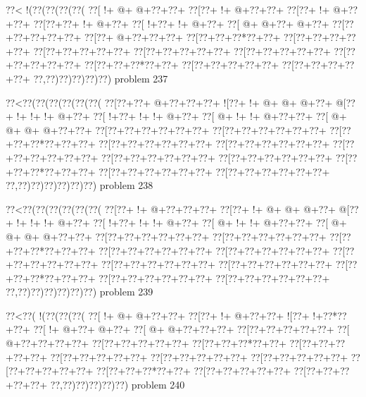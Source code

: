 \vbox{\vbox{\goo
\0??<\- !(\0??(\0??(\0??(\0??(
\0??[\- !+\- @+\- @+\0??+\0??+
\0??[\0??+\- !+\- @+\0??+\0??+
\0??[\0??+\- !+\- @+\0??+\0??+
\0??[\0??+\0??+\- !+\- @+\0??+
\0??[\- !+\0??+\- !+\- @+\0??+
\0??[\- @+\- @+\0??+\- @+\0??+
\0??[\0??+\0??+\0??+\0??+\0??+
\0??[\0??+\- @+\0??+\0??+\0??+
\0??[\0??+\0??+\0??*\0??+\0??+
\0??[\0??+\0??+\0??+\0??+\0??+
\0??[\0??+\0??+\0??+\0??+\0??+
\0??[\0??+\0??+\0??+\0??+\0??+
\0??[\0??+\0??+\0??+\0??+\0??+
\0??[\0??+\0??+\0??+\0??+\0??+
\0??[\0??+\0??+\0??*\0??+\0??+
\0??[\0??+\0??+\0??+\0??+\0??+
\0??[\0??+\0??+\0??+\0??+\0??+
\0??,\0??)\0??)\0??)\0??)\0??)
}
\hfil problem 237\hfil\break
}

\vbox{\vbox{\goo
\0??<\0??(\0??(\0??(\0??(\0??(\0??(
\0??[\0??+\0??+\- @+\0??+\0??+\0??+
\- ![\0??+\- !+\- @+\- @+\- @+\0??+
\- @[\0??+\- !+\- !+\- !+\- @+\0??+
\0??[\- !+\0??+\- !+\- !+\- @+\0??+
\0??[\- @+\- !+\- !+\- @+\0??+\0??+
\0??[\- @+\- @+\- @+\- @+\0??+\0??+
\0??[\0??+\0??+\0??+\0??+\0??+\0??+
\0??[\0??+\0??+\0??+\0??+\0??+\0??+
\0??[\0??+\0??+\0??*\0??+\0??+\0??+
\0??[\0??+\0??+\0??+\0??+\0??+\0??+
\0??[\0??+\0??+\0??+\0??+\0??+\0??+
\0??[\0??+\0??+\0??+\0??+\0??+\0??+
\0??[\0??+\0??+\0??+\0??+\0??+\0??+
\0??[\0??+\0??+\0??+\0??+\0??+\0??+
\0??[\0??+\0??+\0??*\0??+\0??+\0??+
\0??[\0??+\0??+\0??+\0??+\0??+\0??+
\0??[\0??+\0??+\0??+\0??+\0??+\0??+
\0??,\0??)\0??)\0??)\0??)\0??)\0??)
}
\hfil problem 238\hfil\break
}

\vbox{\vbox{\goo
\0??<\0??(\0??(\0??(\0??(\0??(\0??(
\0??[\0??+\- !+\- @+\0??+\0??+\0??+
\0??[\0??+\- !+\- @+\- @+\- @+\0??+
\- @[\0??+\- !+\- !+\- !+\- @+\0??+
\0??[\- !+\0??+\- !+\- !+\- @+\0??+
\0??[\- @+\- !+\- !+\- @+\0??+\0??+
\0??[\- @+\- @+\- @+\- @+\0??+\0??+
\0??[\0??+\0??+\0??+\0??+\0??+\0??+
\0??[\0??+\0??+\0??+\0??+\0??+\0??+
\0??[\0??+\0??+\0??*\0??+\0??+\0??+
\0??[\0??+\0??+\0??+\0??+\0??+\0??+
\0??[\0??+\0??+\0??+\0??+\0??+\0??+
\0??[\0??+\0??+\0??+\0??+\0??+\0??+
\0??[\0??+\0??+\0??+\0??+\0??+\0??+
\0??[\0??+\0??+\0??+\0??+\0??+\0??+
\0??[\0??+\0??+\0??*\0??+\0??+\0??+
\0??[\0??+\0??+\0??+\0??+\0??+\0??+
\0??[\0??+\0??+\0??+\0??+\0??+\0??+
\0??,\0??)\0??)\0??)\0??)\0??)\0??)
}
\hfil problem 239\hfil\break
}

\vbox{\vbox{\goo
\0??<\0??(\- !(\0??(\0??(\0??(
\0??[\- !+\- @+\- @+\0??+\0??+
\0??[\0??+\- !+\- @+\0??+\0??+
\- ![\0??+\- !+\0??*\0??+\0??+
\0??[\- !+\- @+\0??+\- @+\0??+
\0??[\- @+\- @+\0??+\0??+\0??+
\0??[\0??+\0??+\0??+\0??+\0??+
\0??[\- @+\0??+\0??+\0??+\0??+
\0??[\0??+\0??+\0??+\0??+\0??+
\0??[\0??+\0??+\0??*\0??+\0??+
\0??[\0??+\0??+\0??+\0??+\0??+
\0??[\0??+\0??+\0??+\0??+\0??+
\0??[\0??+\0??+\0??+\0??+\0??+
\0??[\0??+\0??+\0??+\0??+\0??+
\0??[\0??+\0??+\0??+\0??+\0??+
\0??[\0??+\0??+\0??*\0??+\0??+
\0??[\0??+\0??+\0??+\0??+\0??+
\0??[\0??+\0??+\0??+\0??+\0??+
\0??,\0??)\0??)\0??)\0??)\0??)
}
\hfil problem 240\hfil\break
}

